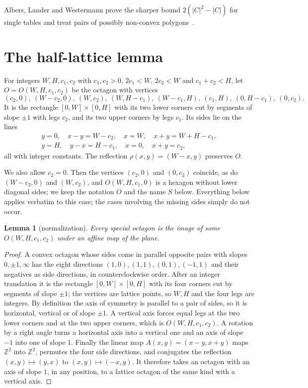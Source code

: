 \documentclass[11pt]{amsart}
\newtheorem{lemma}[theorem]{Lemma}
\theoremstyle{definition}
\theoremstyle{remark}
\newcommand{\Z}{\mathbb Z}
\begin{document}
Albers, Lander and Westermann prove the sharper bound $2(|C|^2-|C|)$ for single tables and treat pairs of possibly non-convex polygons~\cite{ALW26}.

\section{The half-lattice lemma}\label{sec:octagon}

For integers $W,H,c_1,c_2$ with $c_1,c_2>0$, $2c_1<W$, $2c_2<W$ and $c_1+c_2<H$, let $O=O(W,H,c_1,c_2)$ be the octagon with vertices
\[
(c_2,0),\ (W-c_2,0),\ (W,c_2),\ (W,H-c_1),\ (W-c_1,H),\ (c_1,H),\ (0,H-c_1),\ (0,c_2).
\]
It is the rectangle $[0,W]\times[0,H]$ with its two lower corners cut by segments of slope $\pm1$ with legs $c_2$, and its two upper corners by legs $c_1$. Its sides lie on the lines
\begin{equation}\label{eq:lines}
\begin{gathered}
y=0,\quad x-y=W-c_2,\quad x=W,\quad x+y=W+H-c_1,\\
y=H,\quad y-x=H-c_1,\quad x=0,\quad x+y=c_2,
\end{gathered}
\end{equation}
all with integer constants. The reflection $\rho(x,y)=(W-x,y)$ preserves $O$.

We also allow $c_2=0$. Then the vertices $(c_2,0)$ and $(0,c_2)$ coincide, as do $(W-c_2,0)$ and $(W,c_2)$, and $O(W,H,c_1,0)$ is a hexagon without lower diagonal sides; we keep the notation $O$ and the name $S$ below. Everything below applies verbatim to this case; the cases involving the missing sides simply do not occur.

\begin{lemma}[normalization]\label{lem:normal}
Every special octagon is the image of some $O(W,H,c_1,c_2)$ under an affine map of the plane.
\end{lemma}

\begin{proof}
A convex octagon whose sides come in parallel opposite pairs with slopes $0,\pm1,\infty$ has the eight directions $(1,0),(1,1),(0,1),(-1,1)$ and their negatives as side directions, in counterclockwise order. After an integer translation it is the rectangle $[0,W]\times[0,H]$ with its four corners cut by segments of slope $\pm1$; the vertices are lattice points, so $W,H$ and the four legs are integers. By definition the axis of symmetry is parallel to a pair of sides, so it is horizontal, vertical or of slope $\pm1$. A vertical axis forces equal legs at the two lower corners and at the two upper corners, which is $O(W,H,c_1,c_2)$. A rotation by a right angle turns a horizontal axis into a vertical one and an axis of slope $-1$ into one of slope $1$. Finally the linear map $A(x,y)=(x-y,x+y)$ maps $\Z^2$ into $\Z^2$, permutes the four side directions, and conjugates the reflection $(x,y)\mapsto(y,x)$ to $(x,y)\mapsto(-x,y)$. It therefore takes an octagon with an axis of slope $1$, in any position, to a lattice octagon of the same kind with a vertical axis.
\end{proof}
\end{document}
